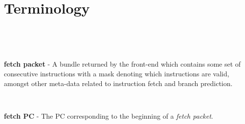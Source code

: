 \chapter{Terminology}



\

\


{\bf fetch packet} - A bundle returned by the front-end which contains some set of consecutive instructions with a mask denoting which instructions are valid, amongst other meta-data related to instruction fetch and branch prediction. 

\

{\bf fetch PC} - The PC corresponding to the beginning of a {\em fetch packet}. 

